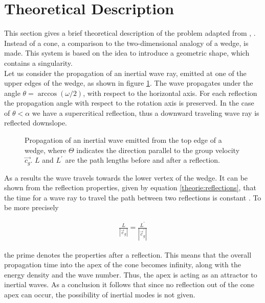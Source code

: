 \section{Theoretical Description}
\label{cone:theorie_theo}

This section gives a brief theoretical description of the problem adapted from \citep{Greenspan1969}, \citep{Beardsley1970}.
Instead of a cone, a comparison to the two-dimensional analogy of a wedge, is made.
This system is based on the idea to introduce a geometric shape, which contains a singularity.\\
Let us consider the propagation of an inertial wave ray, emitted at one of the upper edges of
the wedge, as shown in figure \ref{cone:theorie}.
The wave propagates under the angle $\theta = \arccos(\omega/2)$, with respect to the horizontal axis.
For each reflection the propagation angle with respect to the rotation axis is preserved.
In the case of $\theta<\alpha$ we have a supercritical reflection,
thus a downward traveling wave ray is reflected downslope.

\begin{figure}[!bp]
  \begin{minipage}[c]{0.6\textwidth}
      \centering
  \end{minipage}
  \begin{minipage}[c]{0.3\textwidth}
      \caption{
          Propagation of an inertial wave emitted from the top edge of a wedge,
           where $\Theta$ indicates the direction parallel to the group velocity
            $\vec{c_g}$.  $L$ and $L^{\prime}$ are the path lengths before and after a reflection.
      \label{cone:theorie}
      }
  \end{minipage}
\end{figure}

As a results the wave travels towards the lower vertex of the wedge.
It can be shown from the reflection properties, given by equation \ref{theorie:reflections},
that the time for a wave ray to travel the path between two reflections is constant \citep{Beardsley1970}.
To be more precisely

\begin{align}
    \frac{L}{|\vec{c}_g|} = \frac{L^{\prime}}{|\vec{c}_g^{\prime}|}
\end{align}

the prime denotes the properties after a reflection.
This means that the overall propagation time into the apex of the cone becomes infinity, along with the energy density and the wave number.
Thus, the apex is acting as an attractor to inertial waves.
As a conclusion it follows that since no reflection out of the cone apex can occur, the possibility of inertial modes is not given.


